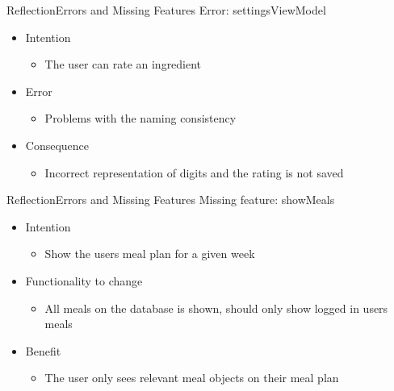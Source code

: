 \begin{frame}{Reflection}{Errors and Missing Features}%
	Error: settingsViewModel
	\begin{itemize}
		\item Intention
			\begin{itemize}
			\item The user can rate an ingredient
			\end{itemize}
		\item Error
			\begin{itemize}
			\item Problems with the naming consistency
			\end{itemize}
		\item Consequence
			\begin{itemize}
			\item Incorrect representation of digits and the rating is not saved
			\end{itemize}
	\end{itemize}
\end{frame}
\begin{frame}{Reflection}{Errors and Missing Features}	
		Missing feature: showMeals
		\begin{itemize}
			\item Intention
				\begin{itemize}
				\item Show the users meal plan for a given week
				\end{itemize}
			\item Functionality to change
				\begin{itemize}
				\item All meals on the database is shown, should only show logged in users meals
				\end{itemize}
			\item Benefit
				\begin{itemize}
				\item The user only sees relevant meal objects on their meal plan
				\end{itemize}
		\end{itemize}
\end{frame} %

